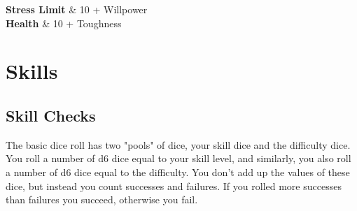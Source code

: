 {}
{
    \textbf{Stress Limit}  & 10 + Willpower\\
    \textbf{Health}        & 10 + Toughness\\
}{}



\chapter{Skills}

\section{Skill Checks}

The basic dice roll has two "pools" of dice, your skill dice and the difficulty dice. 
You roll a number of d6 dice equal to your skill level, and similarly, you also roll a number of d6 dice equal to the difficulty. You don't add up the values of these dice, but instead you count successes and failures.
If you rolled more successes than failures you succeed, otherwise you fail.

